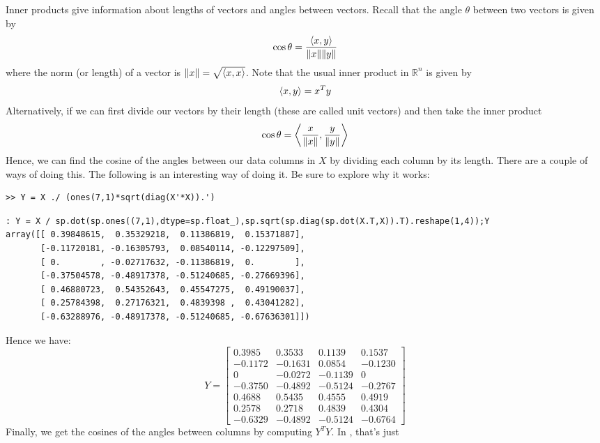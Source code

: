 Inner products give information about lengths of vectors and angles between vectors.  Recall that the angle $\theta$ between two vectors is given by
\[
\cos{\theta} = \frac{\langle x,y \rangle}{\lVert x\rVert\lVert y\rVert}
\]
where the norm (or length) of a vector is $\lVert x\rVert = \sqrt{\langle x,x \rangle}$.  Note that the usual inner product in $\mathbb{R}^n$ is given by
\[
\langle x,y \rangle = x^T y
\]
Alternatively, if we can first divide our vectors by their length (these are called unit vectors) and then take the inner product
\[
\cos{\theta} = \left\langle\frac{x}{\lVert x\rVert},\frac{y}{\lVert y\rVert}\right\rangle
\]
Hence, we can find the cosine of the angles between our data columns in $X$ by dividing each column by its length.  There are a couple of ways of doing this.  The following is an interesting way of doing it.  Be sure to explore why it works:
\begin{matlab}
\begin{lstlisting}[style=matlab]
>> Y = X ./ (ones(7,1)*sqrt(diag(X'*X)).')
\end{lstlisting}
\end{matlab}
\begin{python}
\begin{lstlisting}[style=python]
: Y = X / sp.dot(sp.ones((7,1),dtype=sp.float_),sp.sqrt(sp.diag(sp.dot(X.T,X)).T).reshape(1,4));Y
array([[ 0.39848615,  0.35329218,  0.11386819,  0.15371887],
       [-0.11720181, -0.16305793,  0.08540114, -0.12297509],
       [ 0.        , -0.02717632, -0.11386819,  0.        ],
       [-0.37504578, -0.48917378, -0.51240685, -0.27669396],
       [ 0.46880723,  0.54352643,  0.45547275,  0.49190037],
       [ 0.25784398,  0.27176321,  0.4839398 ,  0.43041282],
       [-0.63288976, -0.48917378, -0.51240685, -0.67636301]])
\end{lstlisting}
\end{python}
Hence we have:
\[
Y=
\begin{bmatrix}
0.3985 & 0.3533 & 0.1139 & 0.1537\\
-0.1172 & -0.1631 & 0.0854 & -0.1230\\
0 &-0.0272 &-0.1139 & 0\\
-0.3750 & -0.4892 & -0.5124 & -0.2767\\
0.4688 & 0.5435 & 0.4555 & 0.4919\\
0.2578 & 0.2718 & 0.4839 & 0.4304\\
-0.6329 & -0.4892 & -0.5124 & -0.6764
\end{bmatrix}
\]
Finally, we get the cosines of the angles between columns by computing $Y^T Y$.  In \ProgrammingLanguage, that's just
